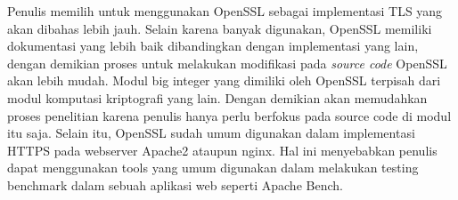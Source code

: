 Penulis memilih untuk menggunakan OpenSSL sebagai implementasi TLS yang akan dibahas lebih jauh. Selain karena banyak digunakan, OpenSSL memiliki dokumentasi yang lebih baik dibandingkan dengan implementasi yang lain, dengan demikian proses untuk melakukan modifikasi pada \textit{source code} OpenSSL akan lebih mudah. Modul big integer yang dimiliki oleh OpenSSL terpisah dari modul komputasi kriptografi yang lain. Dengan demikian akan memudahkan proses penelitian karena penulis hanya perlu berfokus pada source code di modul itu saja. Selain itu, OpenSSL sudah umum digunakan dalam implementasi HTTPS pada webserver Apache2 ataupun nginx. Hal ini menyebabkan penulis dapat menggunakan tools yang umum digunakan dalam melakukan testing benchmark dalam sebuah aplikasi web seperti Apache Bench.
